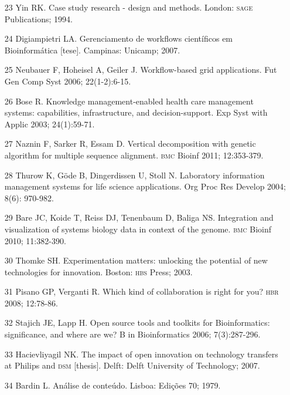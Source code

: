\documentclass{article}
\begin{document}
\begin{itemize}
\item[23] Yin RK. Case study research - design and methods. London: \textsc{sage}
Publications; 1994.

\item[24] Digiampietri LA. Gerenciamento de workflows científicos em
Bioinformática [tese]. Campinas: Unicamp; 2007.

\item[25] Neubauer F, Hoheisel A, Geiler J. Workflow-based grid
applications. Fut Gen Comp Syst 2006; 22(1-2):6-15.

\item[26] Bose R. Knowledge management-enabled health care management
systems: capabilities, infrastructure, and decision-support. Exp Syst with
Applic 2003; 24(1):59-71.

\item[27] Naznin F, Sarker R, Essam D. Vertical decomposition with genetic
algorithm for multiple sequence alignment. \textsc{bmc} Bioinf 2011; 12:353-379.

\item[28] Thurow K, Göde B, Dingerdissen U, Stoll N. Laboratory information
management systems for life science applications. Org Proc Res Develop 2004;
8(6): 970-982.

\item[29] Bare JC, Koide T, Reiss DJ, Tenenbaum D, Baliga NS. Integration
and visualization of systems biology data in context of the genome. \textsc{bmc} Bioinf
2010; 11:382-390.

\item[30] Thomke SH. Experimentation matters: unlocking the potential of new
technologies for innovation. Boston: \textsc{hbs} Press; 2003.

\item[31] Pisano GP, Verganti R. Which kind of collaboration is right for
you? \textsc{hbr} 2008; 12:78-86.

\item[32] Stajich JE, Lapp H. Open source tools and toolkits for
Bioinformatics: significance, and where are we? B in Bioinformatics 2006;
7(3):287-296.

\item[33] Hacievliyagil NK. The impact of open innovation on technology
transfers at Philips and \textsc{dsm} [thesis]. Delft: Delft University of Technology;
2007.

\item[34] Bardin L. Análise de conteúdo. Lisboa: Edições 70; 1979.


\end{itemize}
\end{document}
